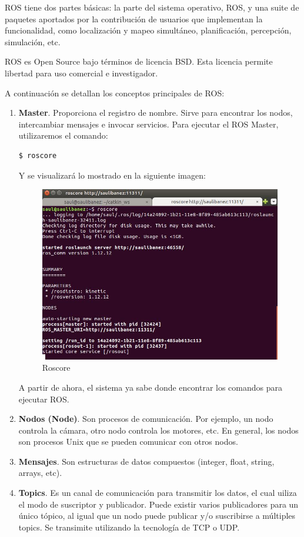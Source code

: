 ROS tiene dos partes básicas: la parte del sistema operativo, ROS, y una suite de paquetes aportados por la contribución de usuarios que implementan la funcionalidad, como localización y mapeo simultáneo, planificación, percepción, simulación, etc.

ROS es Open Source bajo términos de licencia BSD. Esta licencia permite libertad para uso comercial e investigador.

A continuación se detallan los conceptos principales de ROS:
\begin{enumerate}
 \item \textbf{Master}. Proporciona el registro de nombre. Sirve para encontrar los nodos, intercambiar mensajes e invocar servicios. 
 Para ejecutar el ROS Master, utilizaremos el comando:
  \renewcommand{\lstlistingname}{}
  \begin{lstlisting}[caption=roscore, label={lst:roscore}]
    $ roscore
  \end{lstlisting}
    \newpage

  Y se visualizará lo mostrado en la siguiente imagen:
  
  \begin{figure} [hbtp]
  \begin{center}
    \includegraphics[width=12cm]{img/cap1/roscore}
  \end{center}
  \caption{Roscore}
  \label{fig:roscore}
  \end{figure}
  
  A partir de ahora, el sistema ya sabe donde encontrar los comandos para ejecutar ROS.
  \item \textbf{Nodos (Node)}. Son procesos de comunicación. Por ejemplo, un nodo controla la cámara, otro nodo controla los motores, etc. En general, los nodos son procesos Unix que se pueden comunicar con otros nodos.
  \item \textbf{Mensajes}. Son estructuras de datos compuestos (integer, float, string, arrays, etc).
  \item \textbf{Topics}. Es un canal de comunicación para transmitir los datos, el cual uiliza el modo de suscriptor y publicador. Puede existir varios publicadores para un único tópico, al igual que un nodo puede publicar y/o suscribirse a múltiples topics.
  Se transimite utilizando la tecnología de TCP o UDP.
\end{enumerate}


